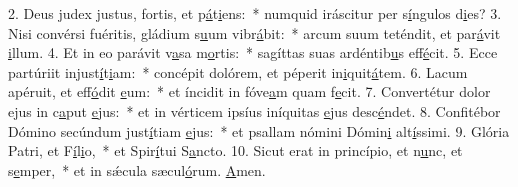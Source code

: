 2. Deus judex justus, fortis, et p\uline{á}t\uline{i}ens:~* numquid iráscitur per s\uline{í}ngulos d\uline{i}es?
3. Nisi convérsi fuéritis, gládium s\uline{u}um vibr\uline{á}bit:~* arcum suum teténdit, et par\uline{á}vit \uline{i}llum.
4. Et in eo parávit v\uline{a}sa m\uline{o}rtis:~* sagíttas suas ardéntib\uline{u}s eff\uline{é}cit.
5. Ecce partúriit injust\uline{í}t\uline{i}am:~* concépit dolórem, et péperit in\uline{i}quit\uline{á}tem.
6. Lacum apéruit, et eff\uline{ó}dit \uline{e}um:~* et íncidit in fóve\uline{a}m quam f\uline{e}cit.
7. Convertétur dolor ejus in c\uline{a}put \uline{e}jus:~* et in vérticem ipsíus iníquitas \uline{e}jus desc\uline{é}ndet.
8. Confitébor Dómino secúndum just\uline{í}tiam \uline{e}jus:~* et psallam nómini Dómin\uline{i} alt\uline{í}ssimi.
9. Glória Patri, et F\uline{í}l\uline{i}o,~* et Spir\uline{í}tui S\uline{a}ncto.
10. Sicut erat in princípio, et n\uline{u}nc, et s\uline{e}mper,~* et in sǽcula sæcul\uline{ó}rum. \uline{A}men.
